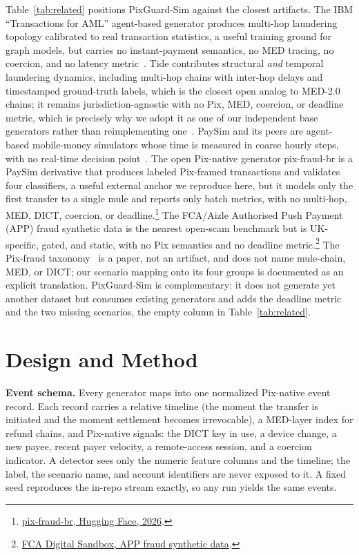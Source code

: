 \documentclass[12pt]{article}
\newcommand{\sysname}{PixGuard-Sim\xspace}
\begin{document}
Table~\ref{tab:related} positions \sysname against the closest artifacts. The
IBM ``Transactions for AML'' agent-based generator produces multi-hop
laundering topology calibrated to real transaction statistics, a useful
training ground for graph models, but carries no instant-payment semantics, no
MED tracing, no coercion, and no latency metric~\cite{altman2023aml}. Tide
contributes structural \emph{and} temporal laundering dynamics, including
multi-hop chains with inter-hop delays and timestamped ground-truth labels,
which is the closest open analog to MED-2.0 chains; it remains
jurisdiction-agnostic with no Pix, MED, coercion, or deadline metric, which is
precisely why we adopt it as one of our independent base generators rather than
reimplementing one~\cite{vandenbeukel2026tide}. PaySim and its peers are
agent-based mobile-money simulators whose time is measured in coarse hourly
steps, with no real-time decision point~\cite{lopezrojas2016paysim}. The open
Pix-native generator pix-fraud-br is a PaySim derivative that produces labeled
Pix-framed transactions and validates four classifiers, a useful external
anchor we reproduce here, but it models only the first transfer to a single
mule and reports only batch metrics, with no multi-hop, MED, DICT, coercion, or
deadline.\footnote{\href{https://huggingface.co/datasets/andremessina/pix-fraud-br}{pix-fraud-br, Hugging Face, 2026}.}
The FCA/Aizle Authorised Push Payment (APP) fraud synthetic data is the nearest
open-scam benchmark but is UK-specific, gated, and static, with no Pix semantics
and no deadline metric.\footnote{\href{https://www.fca.org.uk/firms/innovation/digital-sandbox}{FCA Digital Sandbox, APP fraud synthetic data}.}
The Pix-fraud taxonomy~\cite{pizzolato2025taxonomy} is a paper, not an artifact,
and does not name mule-chain, MED, or DICT; our scenario mapping onto its four
groups is documented as an explicit translation. \sysname{} is complementary:
it does not generate yet another dataset but consumes existing generators and
adds the deadline metric and the two missing scenarios, the empty column in
Table~\ref{tab:related}.

\section{Design and Method}\label{sec:method}

\noindent\textbf{Event schema.} Every generator maps into one normalized
Pix-native event record. Each record carries a relative timeline (the moment the
transfer is initiated and the moment settlement becomes irrevocable), a MED-layer
index for refund chains, and Pix-native signals: the DICT key in use, a device
change, a new payee, recent payer velocity, a remote-access session, and a
coercion indicator. A detector sees only the numeric feature columns and the
timeline; the label, the scenario name, and account identifiers are never
exposed to it. A fixed seed reproduces the in-repo stream exactly, so any run
yields the same events.
\end{document}

